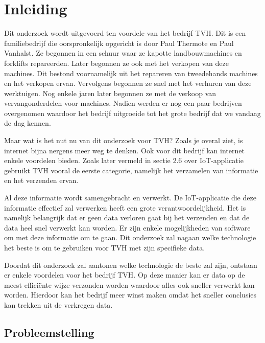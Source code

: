 
\chapter{Inleiding}
\label{ch:inleiding}

Dit onderzoek wordt uitgevoerd ten voordele van het bedrijf TVH. Dit is een familiebedrijf die oorspronkelijk opgericht is door Paul Thermote en Paul Vanhalst. Ze begonnen in een schuur waar ze kapotte landbouwmachines en forklifts repareerden. Later begonnen ze ook met het verkopen van deze machines. Dit bestond voornamelijk uit het repareren van tweedehands machines en het verkopen ervan. Vervolgens begonnen ze snel met het verhuren van deze werktuigen. Nog enkele jaren later begonnen ze met de verkoop van vervangonderdelen voor machines. Nadien werden er nog een paar bedrijven overgenomen waardoor het bedrijf uitgroeide tot het grote bedrijf dat we vandaag de dag kennen. 

Maar wat is het nut nu van dit onderzoek voor TVH? Zoals je overal ziet, is internet bijna nergens meer weg te denken. Ook voor dit bedrijf kan internet enkele voordelen bieden. Zoals later vermeld in sectie 2.6 over IoT-applicatie gebruikt TVH vooral de eerste categorie, namelijk het verzamelen van informatie en het verzenden ervan.

Al deze informatie wordt samengebracht en verwerkt. De IoT-applicatie die deze informatie effectief zal verwerken heeft een grote verantwoordelijkheid. Het is namelijk belangrijk dat er geen data verloren gaat bij het verzenden en dat de data heel snel verwerkt kan worden. Er zijn enkele mogelijkheden van software om met deze informatie om te gaan. Dit onderzoek zal nagaan welke technologie het beste is om te gebruiken voor TVH met zijn specifieke data.

Doordat dit onderzoek zal aantonen welke technologie de beste zal zijn, ontstaan er enkele voordelen voor het bedrijf TVH. Op deze manier kan er data op de meest efficiënte wijze verzonden worden waardoor alles ook sneller verwerkt kan worden. Hierdoor kan het bedrijf meer winst maken omdat het sneller conclusies kan trekken uit de verkregen data. 




\section{Probleemstelling}
\label{sec:probleemstelling}

